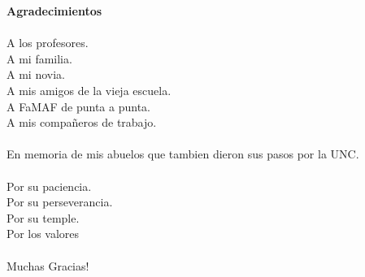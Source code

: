 {\huge \textbf{Agradecimientos}}\\
\\
A los profesores.\\
A mi familia.\\
A mi novia.\\
A mis amigos de la vieja escuela.\\
A FaMAF de punta a punta.\\
A mis compa\~neros de trabajo.\\
\\
En memoria de mis abuelos que tambien dieron sus pasos por la UNC.\\\\
\noindent
Por su paciencia.\\
Por su perseverancia.\\
Por su temple.\\
Por los valores\\
\\
Muchas Gracias!


\newpage
